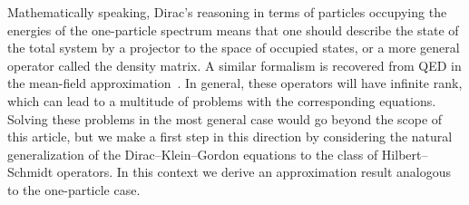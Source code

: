 \documentclass[10pt]{amsart}
\theoremstyle{definition}\newtheorem{defi}[theo]{Definition}\newtheorem{rema}[theo]{Remark}\newtheorem{exam}[theo]{Example}\newtheorem{exem}[theo]{Example}\newtheorem{nota}[theo]{Notation}
\begin{document}
Mathematically speaking, Dirac's reasoning in terms of particles occupying the energies of the one-particle spectrum means that one should describe the state of the total system by a projector to the space of occupied states, or a more general operator called the density matrix. A similar formalism is recovered from QED in the mean-field approximation~\cite{chaix1989}. In general, these operators will have infinite rank, which can lead to a multitude of problems with the corresponding equations. Solving these problems in the most general case would go beyond the scope of this article, but we make a first step in this direction by considering the natural generalization of the Dirac--Klein--Gordon equations to the class of Hilbert--Schmidt operators. In this context we derive an approximation result analogous to the one-particle case.
\end{document}
